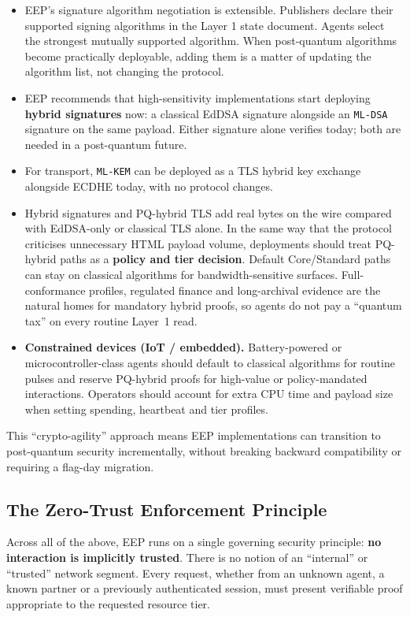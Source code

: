 \documentclass[12pt,a4paper]{article}
\begin{document}
\begin{itemize}
    \item EEP's signature algorithm negotiation is extensible. Publishers declare their supported signing algorithms in the Layer 1 state document. Agents select the strongest mutually supported algorithm. When post-quantum algorithms become practically deployable, adding them is a matter of updating the algorithm list, not changing the protocol.
    \item EEP recommends that high-sensitivity implementations start deploying \textbf{hybrid signatures} now: a classical EdDSA signature alongside an \texttt{ML-DSA} signature on the same payload. Either signature alone verifies today; both are needed in a post-quantum future.
    \item For transport, \texttt{ML-KEM} can be deployed as a TLS hybrid key exchange alongside ECDHE today, with no protocol changes.
    \item Hybrid signatures and PQ-hybrid TLS add real bytes on the wire compared with EdDSA-only or classical TLS alone. In the same way that the protocol criticises unnecessary HTML payload volume, deployments should treat PQ-hybrid paths as a \textbf{policy and tier decision}. Default Core/Standard paths can stay on classical algorithms for bandwidth-sensitive surfaces. Full-conformance profiles, regulated finance and long-archival evidence are the natural homes for mandatory hybrid proofs, so agents do not pay a ``quantum tax'' on every routine Layer~1 read.
    \item \textbf{Constrained devices (IoT / embedded).} Battery-powered or microcontroller-class agents should default to classical algorithms for routine pulses and reserve PQ-hybrid proofs for high-value or policy-mandated interactions. Operators should account for extra CPU time and payload size when setting spending, heartbeat and tier profiles.
\end{itemize}

This ``crypto-agility'' approach means EEP implementations can transition to post-quantum security incrementally, without breaking backward compatibility or requiring a flag-day migration.

\subsection{The Zero-Trust Enforcement Principle}

Across all of the above, EEP runs on a single governing security principle: \textbf{no interaction is implicitly trusted}. There is no notion of an ``internal'' or ``trusted'' network segment. Every request, whether from an unknown agent, a known partner or a previously authenticated session, must present verifiable proof appropriate to the requested resource tier.
\end{document}
